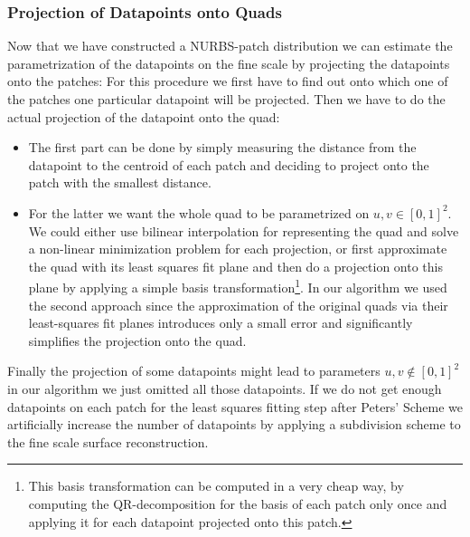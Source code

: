 \subsubsection{Projection of Datapoints onto Quads}
Now that we have constructed a \ac{NURBS}-patch distribution we can estimate the parametrization of the datapoints on the fine scale by projecting the datapoints onto the patches: For this procedure we first have to find out onto which one of the patches one particular datapoint will be projected. Then we have to do the actual projection of the datapoint onto the quad: 
\begin{itemize}
\item The first part can be done by simply measuring the distance from the datapoint to the centroid of each patch and deciding to project onto the patch with the smallest distance. 

\item For the latter we want the whole \ac{quad} to be parametrized on $u,v\in\left[0,1\right]^2$. We could either use bilinear interpolation for representing the quad and solve a non-linear minimization problem for each projection, or first approximate the quad with its least squares fit plane and then do a projection onto this plane by applying a simple basis transformation\footnote{This basis transformation can be computed in a very cheap way, by computing the QR-decomposition for the basis of each patch only once and applying it for each datapoint projected onto this patch.}. In our algorithm we used the second approach since the approximation of the original \acp{quad} via their least-squares fit planes introduces only a small error and significantly simplifies the projection onto the \ac{quad}.
\end{itemize}
Finally the projection of some datapoints might lead to parameters $u,v\not\in\left[0,1\right]^2$ in our algorithm we just omitted  all those datapoints. If we do not get enough datapoints on each patch for the least squares fitting step after Peters' Scheme we artificially increase the number of datapoints by applying a subdivision scheme to the fine scale surface reconstruction.

